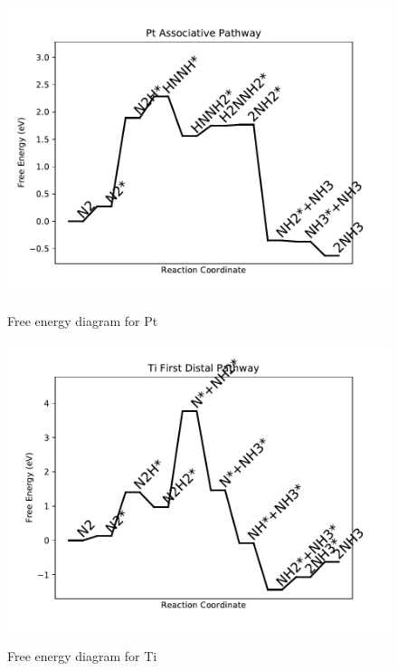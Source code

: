 \documentclass{article}
\begin{document}
\begin{figure}
\includegraphics[width=1\linewidth]{data/plots/Pt_associative.pdf}
\label{fig:Pt_associative}
\caption{Free energy diagram for Pt}
\end{figure}

\begin{figure}
\includegraphics[width=1\linewidth]{data/plots/Ti_distal_1.pdf}
\label{fig:Ti_distal_1}
\caption{Free energy diagram for Ti}
\end{figure}
\end{document}
